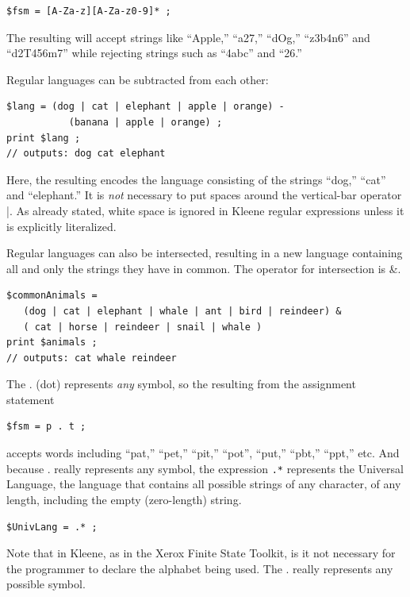 \begin{Verbatim}
$fsm = [A-Za-z][A-Za-z0-9]* ;
\end{Verbatim}

\noindent
The resulting \fsm{} will accept strings like ``Apple,'' ``a27,'' ``dOg,''
``z3b4n6'' and
``d2T456m7'' while rejecting strings such as ``4abc'' and ``26.''

Regular languages can be subtracted from each other:

\begin{Verbatim}
$lang = (dog | cat | elephant | apple | orange) - 
           (banana | apple | orange) ;
print $lang ;
// outputs: dog cat elephant
\end{Verbatim}

\noindent
Here, the resulting \fsm{} encodes the language consisting of the strings ``dog,'' ``cat'' and ``elephant.''
It is \emph{not} necessary to put spaces around the vertical-bar operator |.
As already stated, white space is ignored in Kleene regular expressions
unless it is explicitly literalized.

Regular languages can also be intersected, resulting in a new language
containing all and only the strings they have in common.
The operator for intersection is \&.

\begin{Verbatim}
$commonAnimals = 
   (dog | cat | elephant | whale | ant | bird | reindeer) & 
   ( cat | horse | reindeer | snail | whale )
print $animals ;
// outputs: cat whale reindeer
\end{Verbatim}

The . (dot) represents \emph{any} symbol, so the \fsm{} resulting from the
assignment statement

\begin{Verbatim}
$fsm = p . t ;
\end{Verbatim}

\noindent
accepts words including ``pat,'' ``pet,'' ``pit,'' ``pot'',
``put,'' ``pbt,'' ``ppt,'' etc.  And because . really 
represents any symbol, the expression
\verb!.*! represents the Universal Language, the language that contains all possible
strings of any character, of any length, including the empty (zero-length) string.

\begin{Verbatim}
$UnivLang = .* ;
\end{Verbatim}

\noindent
Note that in Kleene, as in the Xerox Finite State Toolkit, is it not necessary
for the programmer to declare the alphabet being used.  The . really represents any possible symbol.

